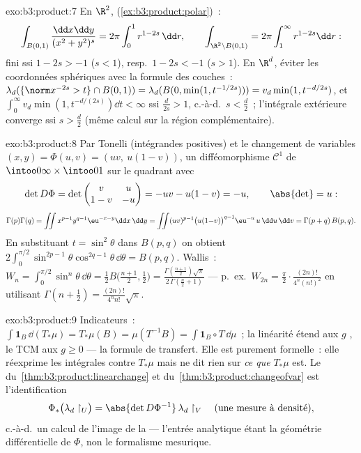 \begin{solution}{exo:b3:product:7}
En $\R^2$,  (\cref{ex:b3:product:polar})~:
\[
\int_{B(0,1)}\frac{\dd x\dd y}{(x^2+y^2)^s}
= 2\pi\int_0^1 r^{1 - 2s}\,\dd r,
\qquad
\int_{\R^2\setminus B(0,1)} = 2\pi\int_1^\infty r^{1-2s}\dd r:
\]
fini ssi $1 - 2s > -1$ ($s < 1$), resp.\ $1 - 2s < -1$ ($s >
1$). En $\R^d$, éviter les coordonnées sphériques avec la
formule des couches~: $\lambda_d(\{\norm x^{-2s} > t\}\cap
B(0,1)) = \lambda_d(B(0, \min(1, t^{-1/2s}))) =
v_d\min(1, t^{-d/2s})$, et $\int_0^\infty v_d\min(1,
t^{-d/(2s)})\dd t < \infty$ ssi $\frac d{2s} > 1$, c.-à-d.\
$s < \frac d2$~; l'intégrale extérieure converge ssi $s >
\frac d2$ (même calcul sur la région complémentaire).
\end{solution}

\begin{solution}{exo:b3:product:8}
Par Tonelli (intégrandes positives) et le changement de
variables $(x, y) = \Phi(u, v) = (uv,\ u(1-v))$, un
difféomorphisme $\mathcal C^1$ de
$\intoo0\infty\times\intoo01$ sur le quadrant  avec
\[
\det D\Phi = \det\begin{pmatrix} v & u\\ 1 - v & -u
\end{pmatrix} = -uv - u(1 - v) = -u,
\qquad \abs{\det} = u :
\]
\[
\Gamma(p)\Gamma(q) =
\iint x^{p-1}y^{q-1}\eu^{-x-y}\dd x\,\dd y
= \iint (uv)^{p-1}\bigl(u(1{-}v)\bigr)^{q-1}\eu^{-u}\,u\,
\dd u\,\dd v
= \Gamma(p + q)\,B(p, q).
\]
En substituant $t = \sin^2\theta$ dans $B(p,q)$ on obtient
$2\int_0^{\pi/2}\sin^{2p-1}\theta\cos^{2q-1}\theta\,\dd\theta =
B(p, q)$. Wallis~: $W_n =
\int_0^{\pi/2}\sin^n\theta\,\dd\theta = \frac12B\bigl(\frac{n +
1}2, \frac12\bigr) = \frac{\Gamma(\frac{n+1}2)\sqrt\pi}
{2\,\Gamma(\frac n2 + 1)}$ --- p.~ex.\ $W_{2n} =
\frac\pi2\cdot\frac{(2n)!}{4^n(n!)^2}$ en utilisant
$\Gamma(n + \frac12) = \frac{(2n)!}{4^nn!}\sqrt\pi$.
\end{solution}

\begin{solution}{exo:b3:product:9}
Indicateurs~: $\int\mathbf 1_B\,\dd(T_*\mu) = T_*\mu(B) =
\mu(T^{-1}B) = \int\mathbf 1_B\circ T\,\dd\mu$~; la linéarité
étend aux $g$ , le TCM aux $g \geq 0$ --- la formule
de transfert. Elle est purement formelle~: elle réexprime les
intégrales contre $T_*\mu$ mais ne dit rien sur \emph{ce que}
$T_*\mu$ est. Le 
du~\cref{thm:b3:product:linearchange} et
du~\cref{thm:b3:product:changeofvar} est l'identification
\[
\Phi_*\bigl(\lambda_d\restriction_U\bigr) =
\abs{\det D\Phi^{-1}}\,\lambda_d\restriction_V
\quad\text{(une mesure à densité)},
\]
c.-à-d.\ un calcul de l'image de la  ---
l'entrée analytique étant la géométrie différentielle de
$\Phi$, non le formalisme mesurique.
\end{solution}

